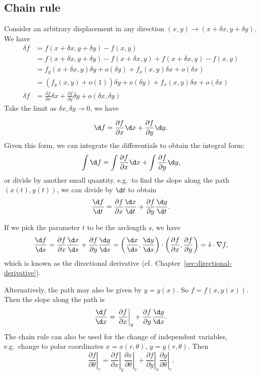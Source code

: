 \documentclass[a4paper]{article}
\begin{document}
\subsection{Chain rule}
Consider an arbitrary displacement in any direction $(x, y) \to (x+\delta x, y + \delta y)$. We have
\begin{align*}
  \delta f &= f(x+\delta x, y + \delta y) - f(x, y)\\
  &= f(x+\delta x, y + \delta y) - f(x + \delta x, y) + f(x+\delta x, y) - f(x, y)\\
  &= f_y(x + \delta x, y)\delta y + o(\delta y) + f_x(x, y)\delta x + o(\delta x)\\
  &= (f_y(x, y) + o(1))\delta y + o(\delta y) + f_x(x, y)\delta x + o(\delta x)\\
  \delta f&= \frac{\partial f}{\partial x}\delta x + \frac{\partial f}{\partial y}\delta y + o(\delta x, \delta y)
\end{align*}
Take the limit as $\delta x, \delta y \to 0$, we have
\begin{thm}
  \[
    \d f = \frac{\partial f}{\partial x}\d x + \frac{\partial f}{\partial y}\d y.
  \]
  Given this form, we can integrate the differentials to obtain the integral form:
  \[
    \int \d f = \int \frac{\partial f}{\partial x}\d x + \int \frac{\partial f}{\partial y}\d y,
  \]
  or divide by another small quantity. e.g.\ to find the slope along the path $(x(t), y(t))$, we can divide by $\d t$ to obtain
  \[
    \frac{\d f}{\d t} = \frac{\partial f}{\partial x}\frac{\d x}{\d t} + \frac{\partial f}{\partial y}\frac{\d y}{\d t}.
  \]
\end{thm}

If we pick the parameter $t$ to be the arclength $s$, we have
\[
  \frac{\d f}{\d s} = \frac{\partial f}{\partial x}\frac{\d x}{\d s} + \frac{\partial f}{\partial y}\frac{\d y}{\d s} = \left(\frac{\d x}{\d s}, \frac{\d y}{\d s}\right)\cdot \left(\frac{\partial f}{\partial x}, \frac{\partial f}{\partial y}\right) = \hat{s}\cdot \nabla f,
\]
which is known as the directional derivative (cf.\ Chapter~\ref{sec:directional-derivative}).

Alternatively, the path may also be given by $y = y(x)$. So $f = f(x, y(x))$. Then the slope along the path is
\[
  \frac{\d f}{\d x} = \left.\frac{\partial f}{\partial x}\right|_y + \frac{\partial f}{\partial y}{\frac{\d y}{\d x}}.
\]
The chain rule can also be used for the change of independent variables, e.g.\ change to polar coordinates $x = x(r, \theta)$, $y = y(r, \theta)$. Then
\[
  \left.\frac{\partial f}{\partial \theta}\right|_r = \left. \frac{\partial f}{\partial x}\right|_y \left.\frac{\partial x}{\partial \theta}\right|_r + \left.\frac{\partial f}{\partial y}\right|_x\left.\frac{\partial y}{\partial \theta}\right|_r.
\]
\end{document}
